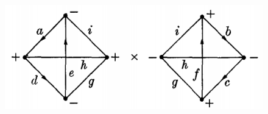 \documentclass[11pt]{article}
\begin{document}
\begin{appendices}
\begin{figure}[!htb]
	\caption{}
	\label{fig:transf2}
\end{figure}
\begin{figure}[!htb]
	\centering
	\includegraphics[scale=0.7]{transformation_2}
	\caption{}
	\label{fig:transf1}
\end{figure}


\end{appendices}









\end{document}

